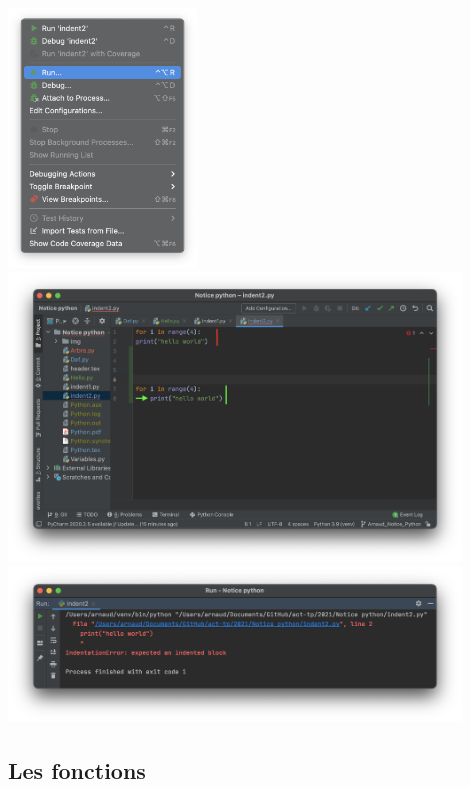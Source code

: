 \begin{Exercice}[5 minutes]
\begin{solution}
\begin{center}
\includegraphics[width=5cm]{run1.png}	
\includegraphics[width=12cm]{indent.png}	
\includegraphics[width=12cm]{indenterror.png}	
\end{center}

\end{solution}
\end{Exercice}


\subsection{Les fonctions}

